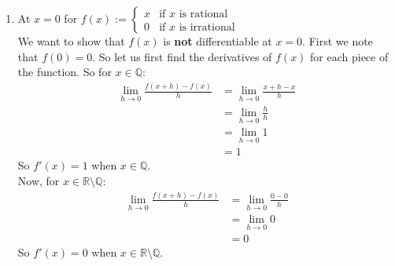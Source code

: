 \documentclass[12pt,letterpaper]{article}
\newcommand{\R}{\mathbb{R}}
\newcommand{\Q}{\mathbb{Q}}
\theoremstyle{case}
\theoremstyle{definition}
\newtheorem{theorem*}{Theorem}
\begin{document}
\begin{enumerate}
\begin{enumerate}
			We note that $-|x| \leq g(x) \leq |x|$, and that $\lim\limits_{x \to 0} -|x|=\lim\limits_{x \to 0} |x|= 0$.\\
			
			Recall the \textit{Squeeze Theorem}:
			\begin{theorem*}[\textbf{Squeeze Theorem}]
				Let $A \subseteq \R$, let $f,g,h:A \rightarrow \R$, and let $c \in \R$ be a cluster point of $A$. If
				\[f(x) \leq g(x) \leq h(x)\ \ \ \ \text{for all}\ \ \ \ x \in A,\ x \neq c,\]
				and if $\lim\limits_{x\to c} f = L = \lim\limits_{x\to c} h$, then $\lim\limits_{x\to c} g =L$.
			\end{theorem*}
			By the \textit{Squeeze Theorem} $\lim\limits_{x \to 0} g(x)=0$. Thus we have that $f$ is differentiable at $x=0$ and $f'(0)=0$.\\
			\item At $x=0$ for $f(x):=\begin{cases}
				x &\text{if } x \text{ is rational} \\
				0 &\text{if } x \text{ is irrational}
			\end{cases}$ \\
			
			We want to show that $f(x)$ is \textbf{not} differentiable at $x=0$. First we note that $f(0)=0$. So let us first find the derivatives of $f(x)$ for each piece of the function. So for $x \in \Q$:
			\begin{align*}
				\lim\limits_{h \to 0} \frac{f(x+h)-f(x)}{h} &= \lim\limits_{h \to 0} \frac{x+h-x}{h} \\
				&= \lim\limits_{h \to 0} \frac{h}{h} \\
				&= \lim\limits_{h \to 0} 1 \\
				&= 1
			\end{align*}
			So $f'(x)=1$ when $x \in \Q$.\\
			
			Now, for $x \in \R \setminus \Q$:
			\begin{align*}
				\lim\limits_{h \to 0} \frac{f(x+h)-f(x)}{h} &= \lim\limits_{h \to 0} \frac{0-0}{h} \\
				&= \lim\limits_{h \to 0} 0 \\
				&= 0
			\end{align*}
			So $f'(x)=0$ when $x \in \R\setminus\Q$.\\
			

\end{enumerate}
\end{enumerate}
\end{document}

